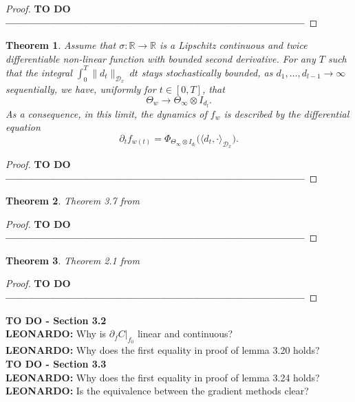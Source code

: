 \documentclass[11pt, a4paper]{article}
\newtheorem{theorem}{Theorem}[section]
\newcommand{\R}{\mathds{R}}
\newcommand{\D}{\mathcal{D}}
\begin{document}
\begin{proof}
\textbf{TO DO ---------------------------------------------------------------------------------}
\end{proof}

\begin{theorem}
Assume that $\sigma : \R \to \R$ is a Lipschitz continuous and twice differentiable non-linear function with bounded second derivative. For any $T$ such that the integral $\int_{0}^{T} \| d_t \|_{\D_x} \ dt$ stays stochastically bounded, as $d_1, \dots, d_{l-1} \to \infty$ sequentially, we have, uniformly for $t \in [0,T]$, that
\[ \Theta_w \to \Theta_{\infty} \otimes I_{d_l}. \]
As a consequence, in this limit, the dynamics of $f_w$ is described by the differential equation
\[ \partial_tf_{w(t)} = \Phi_{\Theta_{\infty} \otimes I_{d_l}} \Big ( \big \langle d_t, \cdot \big \rangle_{\D_x} \Big ). \]
\end{theorem}

\begin{proof}
\textbf{TO DO ---------------------------------------------------------------------------------}
\end{proof}

\begin{theorem} \label{thm:stieltjes}
Theorem 3.7 from \cite{Stieltjes}
\end{theorem}

\begin{proof}
\textbf{TO DO ---------------------------------------------------------------------------------}
\end{proof}

\begin{theorem} \label{thm:linear}
Theorem 2.1 from \cite{Linear}
\end{theorem}

\begin{proof}
\textbf{TO DO ---------------------------------------------------------------------------------}
\end{proof}

\pagebreak
\textbf{TO DO - Section 3.2} \\
\textbf{LEONARDO:} Why is $\partial_{f} C |_{f_0}$ linear and continuous? \\
\textbf{LEONARDO:} Why does the first equality in proof of lemma 3.20 holds? \\

\textbf{TO DO - Section 3.3} \\
\textbf{LEONARDO:} Why does the first equality in proof of lemma 3.24 holds? \\
\textbf{LEONARDO:} Is the equivalence between the gradient methods clear? \\
\end{document}
